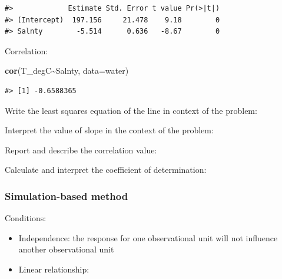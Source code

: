 \documentclass[
]{report}
\newenvironment{Shaded}{\begin{snugshade}}{\end{snugshade}}
\newcommand{\AttributeTok}[1]{\textcolor[rgb]{0.13,0.29,0.53}{#1}}
\newcommand{\FunctionTok}[1]{\textcolor[rgb]{0.13,0.29,0.53}{\textbf{#1}}}
\newcommand{\NormalTok}[1]{#1}
\newcommand{\SpecialCharTok}[1]{\textcolor[rgb]{0.81,0.36,0.00}{\textbf{#1}}}
\begin{document}
\begin{verbatim}
#>             Estimate Std. Error t value Pr(>|t|)
#> (Intercept)  197.156     21.478    9.18        0
#> Salnty        -5.514      0.636   -8.67        0
\end{verbatim}

Correlation:

\begin{Shaded}
\begin{Highlighting}[]
\FunctionTok{cor}\NormalTok{(T\_degC}\SpecialCharTok{\textasciitilde{}}\NormalTok{Salnty, }\AttributeTok{data=}\NormalTok{water)}
\end{Highlighting}
\end{Shaded}

\begin{verbatim}
#> [1] -0.6588365
\end{verbatim}

Write the least squares equation of the line in context of the problem:

\vspace{0.5in}

Interpret the value of slope in the context of the problem:

\vspace{0.5in}

Report and describe the correlation value:

\vspace{0.5in}

Calculate and interpret the coefficient of determination:

\vspace{0.8in}

\subsubsection*{Simulation-based method}\label{simulation-based-method-9}

Conditions:

\begin{itemize}
\item
  Independence: the response for one observational unit will not influence another observational unit
\item
  Linear relationship:
\end{itemize}

\vspace{0.3in}
\end{document}
